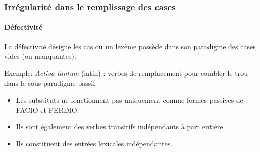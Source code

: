 \begin{frame}[noframenumbering]
\frametitle{Irrégularité dans le remplissage des cases}
\framesubtitle{Défectivité}
La défectivité désigne les cas où un lexème possède dans son paradigme des
cases vides (ou manquantes). 

Exemple: {\em Activa tantum} (latin) \cite{kiparsky04}: verbes de
remplacement pour combler le trou dans le sous-paradigme passif.

\noindent{}

\pause
\begin{itemize}
\item Les substituts ne
      fonctionnent pas uniquement comme formes passives de  {\scriptsize{FACIO}} 
    et {\scriptsize{PERDIO}}.
  \item Ils sont également des verbes transitifs
    indépendants à part entière.
  \item Ils constituent des entrées lexicales
    indépendantes.
\end{itemize}
\end{frame}



